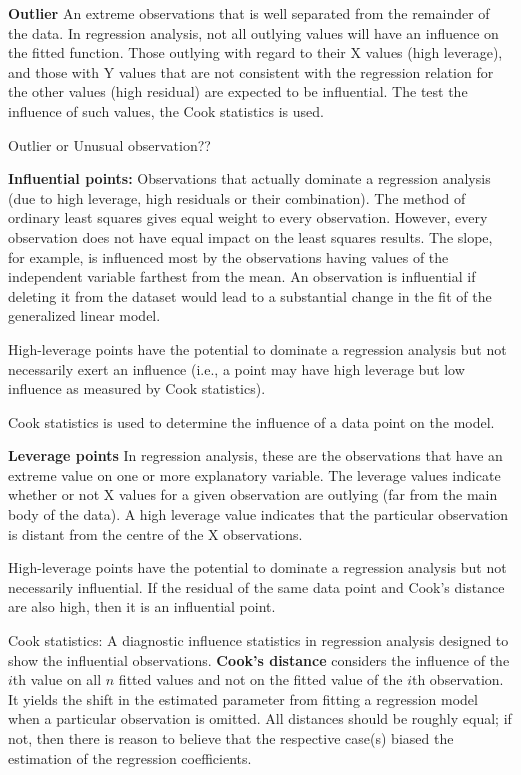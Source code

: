 \documentclass[12pt, a4paper]{report}
\begin{document}
\textbf{Outlier} An extreme observations that is well separated from the remainder of the data. In regression analysis, not all outlying values will have an influence on the fitted function. Those outlying with regard to their X values (high leverage), and those with Y values that are not consistent with the regression relation for the other values (high residual) are expected to be influential. The test the influence of such values, the Cook statistics is used.

Outlier or Unusual observation??

\textbf{Influential points:} Observations that actually dominate a regression analysis (due to high leverage, high residuals or their combination). The method of ordinary least squares gives equal weight to every observation. However, every observation does not have equal impact on the least squares results. The slope, for example, is influenced most by the observations having values of the independent variable farthest from the mean. An observation is influential if deleting it from the dataset would lead to a substantial change in the fit of the generalized linear model.

High-leverage points have the potential to dominate a regression analysis but not necessarily exert an influence (i.e., a point may have high leverage but low influence as measured by Cook statistics).

Cook statistics is used to determine the influence of a data point on the model.

\textbf{Leverage points} In regression analysis, these are the observations that have an extreme value on one or more explanatory variable. The leverage values indicate whether or not X values for a given observation are outlying (far from the main body of the data). A high leverage value indicates that the particular observation is distant from the centre of the X observations.

High-leverage points have the potential to dominate a regression analysis but not necessarily influential. If the residual of the same data point and Cook's distance are also high, then it is an influential point.




Cook statistics: A diagnostic influence statistics in regression analysis designed to show the influential observations.
\textbf{Cook's distance} considers the influence of the $i$th value on all $n$ fitted values and not on the fitted value of the $i$th observation. It yields the shift in the estimated parameter from fitting a regression model when a particular observation is omitted. All distances should be roughly equal; if not, then there is reason to believe that the respective case(s) biased the estimation of the regression coefficients.
\end{document}
